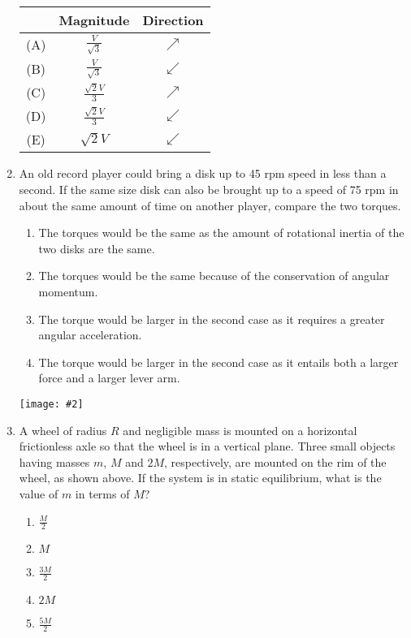 \documentclass[11pt]{article}
\newcommand{\pic}[2]{\texttt{[image: \#2]}}
\begin{document}
\begin{multicols}{2}
\begin{enumerate}[leftmargin=18pt,resume]
    \begin{tabular}{ccc}
      & Magnitude & Direction \\
      \hline
      (A) & $\displaystyle\frac{V}{\sqrt{3}}$ & $\nearrow$ \\
      (B) & $\displaystyle\frac{V}{\sqrt{3}}$ & $\swarrow$ \\
      (C) & $\displaystyle\frac{\sqrt{2}V}{3}$ & $\nearrow$ \\
      (D) & $\displaystyle\frac{\sqrt{2}V}{3}$ & $\swarrow$ \\
      (E) & $\displaystyle\sqrt{2}V$ & $\swarrow$ \\
    \end{tabular}
    \vspace{.7in}
    
  \item An old record player could bring a disk up to 45 rpm speed in less than
    a second. If the same size disk can also be brought up to a speed of 75 rpm
    in about the same amount of time on another player, compare the two torques.
    \begin{enumerate}[nosep,leftmargin=18pt,label=(\Alph*)]
    \item The torques would be the same as the amount of rotational inertia of
      the two disks are the same.
    \item The torques would be the same because of the conservation of angular
      momentum.
    \item The torque would be larger in the second case as it requires a
      greater angular acceleration.
    \item The torque would be larger in the second case as it entails both a
      larger force and a larger lever arm.
    \end{enumerate}
    \columnbreak
    
    \begin{center}
      \pic{.25}{rim}
    \end{center}
  \item A wheel of radius $R$ and negligible mass is mounted on a horizontal
    frictionless axle so that the wheel is in a vertical plane. Three small
    objects having masses $m$, $M$ and $2M$, respectively, are mounted on the
    rim of the wheel, as shown above. If the system is in static equilibrium,
    what is the value of $m$ in terms of $M$?
    \begin{enumerate}[noitemsep,topsep=0pt,leftmargin=18pt,label=(\Alph*)]
    \item$\displaystyle\frac{M}{2}$
    \item$M$
    \item$\displaystyle\frac{3M}{2}$
    \item$2M$
    \item$\displaystyle\frac{5M}{2}$
    \end{enumerate}


\end{enumerate}
\end{multicols}
\end{document}
